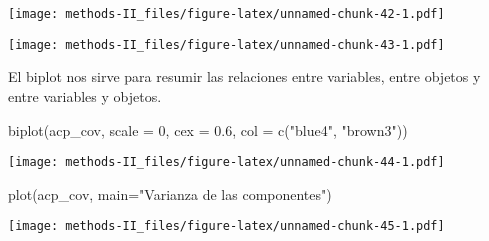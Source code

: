 \documentclass[
]{article}
\newenvironment{Shaded}{\begin{snugshade}}{\end{snugshade}}
\newcommand{\AttributeTok}[1]{\textcolor[rgb]{0.77,0.63,0.00}{#1}}
\newcommand{\DecValTok}[1]{\textcolor[rgb]{0.00,0.00,0.81}{#1}}
\newcommand{\FloatTok}[1]{\textcolor[rgb]{0.00,0.00,0.81}{#1}}
\newcommand{\FunctionTok}[1]{\textcolor[rgb]{0.00,0.00,0.00}{#1}}
\newcommand{\NormalTok}[1]{#1}
\newcommand{\SpecialCharTok}[1]{\textcolor[rgb]{0.00,0.00,0.00}{#1}}
\newcommand{\StringTok}[1]{\textcolor[rgb]{0.31,0.60,0.02}{#1}}
\begin{document}
\begin{Shaded}
\end{Shaded}

\texttt{[image: methods-II\_files/figure-latex/unnamed-chunk-42-1.pdf]}

\begin{Shaded}
\end{Shaded}

\texttt{[image: methods-II\_files/figure-latex/unnamed-chunk-43-1.pdf]}

El biplot nos sirve para resumir las relaciones entre variables, entre
objetos y entre variables y objetos.

\begin{Shaded}
\begin{Highlighting}[]
\FunctionTok{biplot}\NormalTok{(acp\_cov, }\AttributeTok{scale =} \DecValTok{0}\NormalTok{, }\AttributeTok{cex =} \FloatTok{0.6}\NormalTok{, }\AttributeTok{col =} \FunctionTok{c}\NormalTok{(}\StringTok{"blue4"}\NormalTok{, }\StringTok{"brown3"}\NormalTok{))}
\end{Highlighting}
\end{Shaded}

\texttt{[image: methods-II\_files/figure-latex/unnamed-chunk-44-1.pdf]}

\begin{Shaded}
\begin{Highlighting}[]
\FunctionTok{plot}\NormalTok{(acp\_cov, }\AttributeTok{main=}\StringTok{"Varianza de las componentes"}\NormalTok{)}
\end{Highlighting}
\end{Shaded}

\texttt{[image: methods-II\_files/figure-latex/unnamed-chunk-45-1.pdf]}
\end{document}
